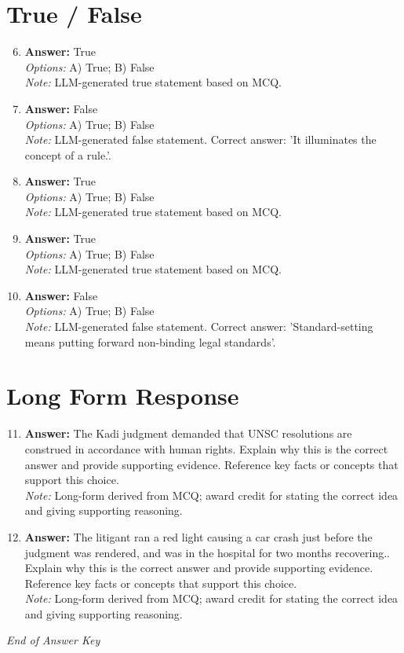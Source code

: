 \documentclass[12pt]{article}
\begin{document}
\section*{True / False}
\begin{enumerate}[label=\arabic*.]
\setcounter{enumi}{5}
\item \textbf{Answer:} True
\\ \textit{Options:} A) True; B) False
\\ \textit{Note:} LLM-generated true statement based on MCQ.
\item \textbf{Answer:} False
\\ \textit{Options:} A) True; B) False
\\ \textit{Note:} LLM-generated false statement. Correct answer: 'It illuminates the concept of a rule.'.
\item \textbf{Answer:} True
\\ \textit{Options:} A) True; B) False
\\ \textit{Note:} LLM-generated true statement based on MCQ.
\item \textbf{Answer:} True
\\ \textit{Options:} A) True; B) False
\\ \textit{Note:} LLM-generated true statement based on MCQ.
\item \textbf{Answer:} False
\\ \textit{Options:} A) True; B) False
\\ \textit{Note:} LLM-generated false statement. Correct answer: 'Standard-setting means putting forward non-binding legal standards'.
\end{enumerate}

\section*{Long Form Response}
\begin{enumerate}[label=\arabic*.]
\setcounter{enumi}{10}
\item \textbf{Answer:} The Kadi judgment demanded that UNSC resolutions are construed in accordance with human rights. Explain why this is the correct answer and provide supporting evidence. Reference key facts or concepts that support this choice.
\\ \textit{Note:} Long-form derived from MCQ; award credit for stating the correct idea and giving supporting reasoning.
\item \textbf{Answer:} The litigant ran a red light causing a car crash just before the judgment was rendered, and was in the hospital for two months recovering.. Explain why this is the correct answer and provide supporting evidence. Reference key facts or concepts that support this choice.
\\ \textit{Note:} Long-form derived from MCQ; award credit for stating the correct idea and giving supporting reasoning.
\end{enumerate}

\vfill
\noindent\textit{End of Answer Key}
\end{document}
